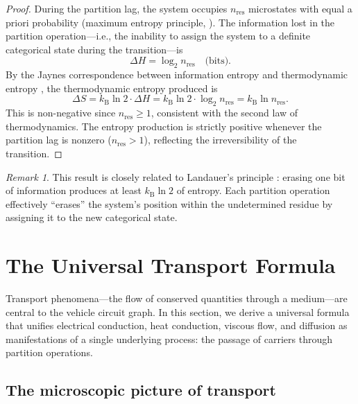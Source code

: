 \documentclass[twocolumn,10pt,a4paper]{article}
\theoremstyle{definition}
\theoremstyle{remark}
\newtheorem{remark}[theorem]{Remark}
\newcommand{\kB}{k_{\mathrm{B}}}
\begin{document}
\begin{proof}
During the partition lag, the system occupies $n_{\mathrm{res}}$ microstates with equal a priori probability (maximum entropy principle, \citealt{Jaynes1957a}). The information lost in the partition operation---i.e., the inability to assign the system to a definite categorical state during the transition---is
\begin{equation}
\Delta H = \log_2 n_{\mathrm{res}} \quad \text{(bits)}.
\end{equation}
By the Jaynes correspondence between information entropy and thermodynamic entropy \citep{Jaynes1957a, Jaynes1957b}, the thermodynamic entropy produced is
\begin{equation}
\Delta S = \kB \ln 2 \cdot \Delta H = \kB \ln 2 \cdot \log_2 n_{\mathrm{res}} = \kB \ln n_{\mathrm{res}}.
\end{equation}
This is non-negative since $n_{\mathrm{res}} \geq 1$, consistent with the second law of thermodynamics. The entropy production is strictly positive whenever the partition lag is nonzero ($n_{\mathrm{res}} > 1$), reflecting the irreversibility of the transition.
\end{proof}

\begin{remark}\label{rem:landauer}
This result is closely related to Landauer's principle \citep{Landauer1961}: erasing one bit of information produces at least $\kB \ln 2$ of entropy. Each partition operation effectively ``erases'' the system's position within the undetermined residue by assigning it to the new categorical state.
\end{remark}


\section{The Universal Transport Formula}\label{sec:transport}

Transport phenomena---the flow of conserved quantities through a medium---are central to the vehicle circuit graph. In this section, we derive a universal formula that unifies electrical conduction, heat conduction, viscous flow, and diffusion as manifestations of a single underlying process: the passage of carriers through partition operations.

\subsection{The microscopic picture of transport}
\end{document}
